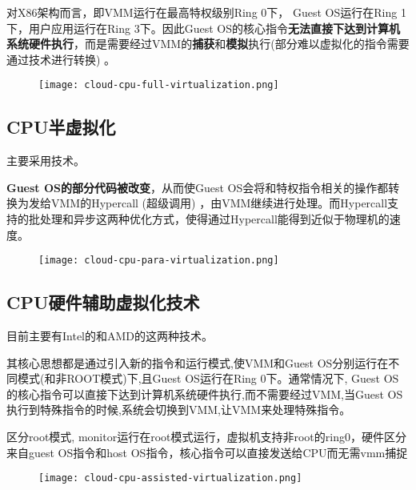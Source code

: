 对X86架构而言，即VMM运行在最高特权级别Ring 0下， Guest OS运行在Ring 1下，用户应用运行在Ring 3下。因此Guest OS的核心指令\textbf{无法直接下达到计算机系统硬件执行}，而是需要经过VMM的\textbf{捕获}和\textbf{模拟}执行(部分难以虚拟化的指令需要通过技术进行转换) 。

\begin{figure}[htbp]
    \begin{center}
        \texttt{[image: cloud-cpu-full-virtualization.png]}
    \end{center}
\end{figure}

\subsection{CPU半虚拟化}
    
主要采用技术。

\textbf{Guest OS的部分代码被改变}，从而使Guest OS会将和特权指令相关的操作都转换为发给VMM的Hypercall (超级调用) ，由VMM继续进行处理。而Hypercall支持的批处理和异步这两种优化方式，使得通过Hypercall能得到近似于物理机的速度。

\begin{figure}[htbp]
    \begin{center}
        \texttt{[image: cloud-cpu-para-virtualization.png]}
    \end{center}
\end{figure}

\subsection{CPU硬件辅助虚拟化技术}

目前主要有Intel的和AMD的这两种技术。

其核心思想都是通过引入新的指令和运行模式,使VMM和Guest OS分别运行在不同模式(和非ROOT模式)下,且Guest OS运行在Ring 0下。通常情况下, Guest OS的核心指令可以直接下达到计算机系统硬件执行,而不需要经过VMM,当Guest OS执行到特殊指令的时候,系统会切换到VMM,让VMM来处理特殊指令。

区分root模式, monitor运行在root模式运行，虚拟机支持非root的ring0，硬件区分来自guest OS指令和host OS指令，核心指令可以直接发送给CPU而无需vmm捕捉

\begin{figure}[htbp]
    \begin{center}
        \texttt{[image: cloud-cpu-assisted-virtualization.png]}
    \end{center}
\end{figure}

